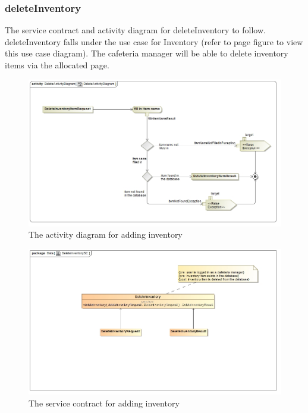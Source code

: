 \documentclass[a4paper,12pt]{article}
\begin{document}
\subsubsection{deleteInventory}
The service contract and activity diagram for deleteInventory to follow. deleteInventory falls under the use case for Inventory (refer to page   figure   to view this use case diagram). The cafeteria manager will be able to delete inventory items via the allocated page.
\begin{figure}[H]
  \centering
    \includegraphics[width=1.0\textwidth]{../images/DeleteActivityDiagram.jpg}
    \caption{The activity diagram for adding inventory} 
\end{figure}

\begin{figure}[H]
	\centering
	\includegraphics[width=1.0\textwidth]{../images/DeleteInventorySC.jpg}
	\caption{The service contract for adding inventory}
\end{figure}
\end{document}
